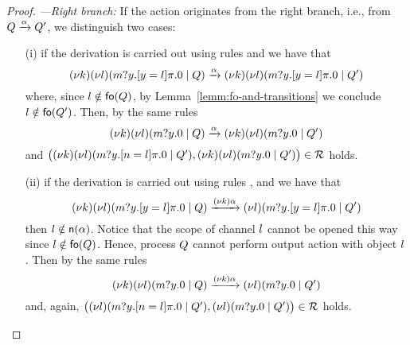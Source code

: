 \begin{proof}
\;\emph{---Right branch:}\;
If the action originates from the right branch, i.e., 
from $Q \xrightarrow{\alpha} Q'$,
we distinguish two cases:
\begin{itemize}
\item [(i)] if the derivation is carried out using rules  and  we have that
%
\[
(\nu k) (\nu l)(m?y.[ y = l ]\pi.0 \;|\; Q)
\xrightarrow{\alpha} 
(\nu k) (\nu l)(m?y.[ y = l ]\pi.0 \;|\; Q')
\]
%
where, since $l\notin\mathsf{fo}(Q)$, by Lemma~\ref{lemm:fo-and-transitions} we conclude $l\notin\mathsf{fo}(Q')$.
Then, by the same rules  
%
\[
(\nu k) (\nu l)(m?y.0 \;|\; Q)
\xrightarrow{\alpha} 
(\nu k) (\nu l)(m?y.0 \;|\; Q')
\]
%
and 
$\big((\nu k) (\nu l)(m?y.[ n = l ]\pi.0 \;|\; Q'),
(\nu k) (\nu l)(m?y.0 \;|\; Q')\big)\in{\cal R}$ holds.
\item [(ii)] if the derivation is carried out using rules ,  and  we have that 
%
\[
(\nu k) (\nu l)(m?y.[ y = l ]\pi.0 \;|\; Q)
\xrightarrow{(\nu k)\alpha} 
(\nu l)(m?y.[ y = l ]\pi.0 \;|\; Q')
\]
then $l\notin\mathsf{n}(\alpha)$. 
Notice that the scope of channel $l$ cannot be opened this way since 
$l\notin\mathsf{fo}(Q)$.
Hence, process $Q$ cannot 
perform output action with object $l$.
Then by the same rules  
%
\[
(\nu k) (\nu l)(m?y.0 \;|\; Q)
\xrightarrow{(\nu k)\alpha} 
 (\nu l)(m?y.0 \;|\; Q')
\]
%
and, again, 
$\big( (\nu l)(m?y.[ n = l ]\pi.0 \;|\; Q'),
 (\nu l)(m?y.0 \;|\; Q')\big)\in{\cal R}$ holds.
\end{itemize} 
%


\end{proof}
